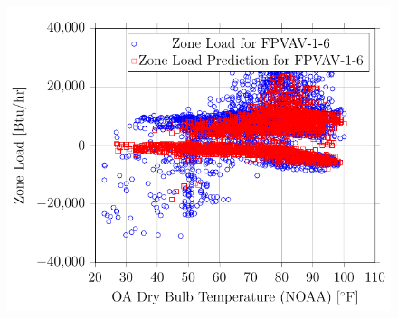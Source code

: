 \begin{figure}
\centering
\includegraphics[]{Plots/31/2017-06-27-1400-BtuhrvsOADryBulbTemperatureNOAAF.pdf}
\caption{}
\label{fig:2017-06-27-1401-BtuhrvsOADryBulbTemperatureNOAAF}
\end{figure}




\pagebreak{}
